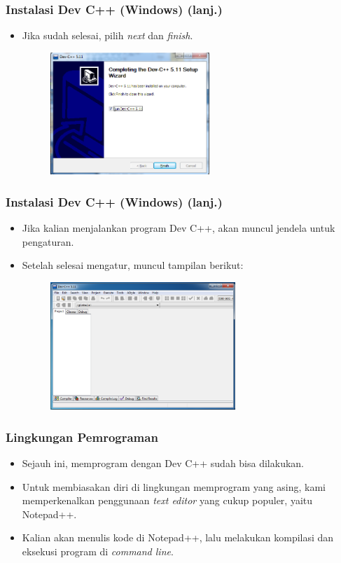 \begin{frame}
\frametitle{Instalasi Dev C++ (Windows) (lanj.)}
\begin{itemize}
  \item Jika sudah selesai, pilih \textit{next} dan \textit{finish}.
  \begin{figure}
    \includegraphics[width=6cm]{asset/devcpp-6.png}
  \end{figure}
\end{itemize}
\end{frame}

\begin{frame}
\frametitle{Instalasi Dev C++ (Windows) (lanj.)}
\begin{itemize}
  \item Jika kalian menjalankan program Dev C++, akan muncul jendela untuk pengaturan.
  \item Setelah selesai mengatur, muncul tampilan berikut:
  \begin{figure}
    \includegraphics[width=7cm]{asset/devcpp-7.png}
  \end{figure}
\end{itemize}
\end{frame}

\begin{frame}
\frametitle{Lingkungan Pemrograman}
\begin{itemize}
  \item Sejauh ini, memprogram dengan Dev C++ sudah bisa dilakukan.
  \item Untuk membiasakan diri di lingkungan memprogram yang asing, kami memperkenalkan penggunaan \textit{text editor} yang cukup populer, yaitu Notepad++.
  \item Kalian akan menulis kode di Notepad++, lalu melakukan kompilasi dan eksekusi program di \textit{command line}. 
\end{itemize}
\end{frame}

